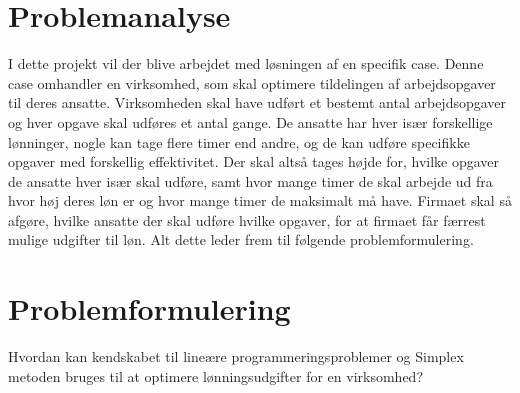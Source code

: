 \section{Problemanalyse}
I dette projekt vil der blive arbejdet med løsningen af en specifik case. 
Denne case omhandler en virksomhed, som skal optimere tildelingen af arbejdsopgaver til deres ansatte.
Virksomheden skal have udført et bestemt antal arbejdsopgaver og hver opgave skal udføres et antal gange. 
De ansatte har hver især forskellige lønninger, nogle kan tage flere timer end andre, og de kan udføre specifikke opgaver med forskellig effektivitet.
Der skal altså tages højde for, hvilke opgaver de ansatte hver især skal udføre, samt hvor mange timer de skal arbejde ud fra hvor høj deres løn er og hvor mange timer de maksimalt må have.
Firmaet skal så afgøre, hvilke ansatte der skal udføre hvilke opgaver, for at firmaet får færrest mulige udgifter til løn. 
Alt dette leder frem til følgende problemformulering.

\section{Problemformulering}
Hvordan kan kendskabet til lineære programmeringsproblemer og Simplex metoden bruges til at optimere lønningsudgifter for en virksomhed?
